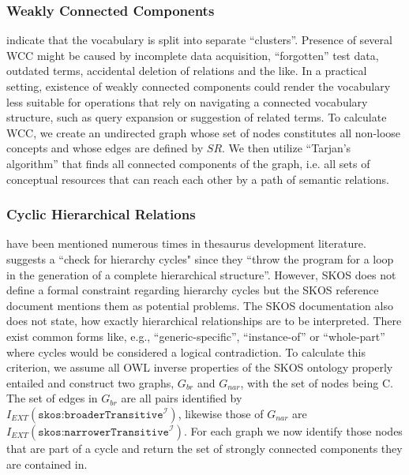 \subsubsection{Weakly Connected Components} indicate that the vocabulary is split into separate ``clusters''. Presence of several WCC might be caused by incomplete data acquisition, ``forgotten'' test data, outdated terms, accidental deletion of relations and the like. In a practical setting, existence of weakly connected components could render the vocabulary less suitable for operations that rely on navigating a connected vocabulary structure, such as query expansion or suggestion of related terms. To calculate WCC, we create an undirected graph whose set of nodes constitutes all non-loose concepts and whose edges are defined by $SR$. We then utilize ``Tarjan’s algorithm''\cite{Hopcroft1973} that finds all connected components of the graph, i.e. all sets of conceptual resources that can reach each other by a path of semantic relations.

 

\subsubsection{Cyclic Hierarchical Relations} have been mentioned numerous times in thesaurus development literature. \cite{Soergel2002} suggests a ``check for hierarchy cycles" since they ``throw the program for a loop in the generation of a complete hierarchical structure''. However, SKOS does not define a formal constraint regarding hierarchy cycles but the SKOS reference document mentions them as potential problems. The SKOS documentation also does not state, how exactly hierarchical relationships are to be interpreted. There exist common forms like, e.g., ``generic-specific'', ``instance-of'' or ``whole-part'' \cite{Hedden2010,Harpring2010,Aitchison2000} where cycles would be considered a logical contradiction. To calculate this criterion, we assume all OWL inverse properties of the SKOS ontology properly entailed and construct two graphs, $G_{br}$ and $G_{nar}$, with the set of nodes being C. The set of edges in $G_{br}$ are all pairs identified by $I_{EXT}(\texttt{skos:broaderTransitive}^\mathcal{I})$, likewise those of $G_{nar}$ are $I_{EXT}(\texttt{skos:narrowerTransitive}^\mathcal{I})$. For each graph we now identify those nodes that are part of a cycle and return the set of strongly connected components they are contained in.

